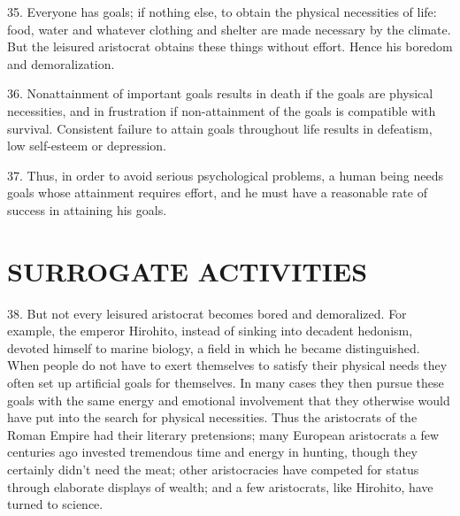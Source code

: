 \documentclass{article}
\begin{document}
35. Everyone has goals; if nothing else, to obtain the physical necessities of life: food, water and 
whatever clothing and shelter are made necessary by the climate. But the leisured aristocrat 
obtains these things without effort. Hence his boredom and demoralization. \vspace{\baselineskip} \newpage

36. Nonattainment of important goals results in death if the goals are physical necessities, and in 
frustration if non-attainment of the goals is compatible with survival. Consistent failure to attain 
goals throughout life results in defeatism, low self-esteem or depression. \vspace{\baselineskip}

37. Thus, in order to avoid serious psychological problems, a human being needs goals whose 
attainment requires effort, and he must have a reasonable rate of success in attaining his goals. 


\section{SURROGATE ACTIVITIES}

\hspace{0.5cm} 38. But not every leisured aristocrat becomes bored and demoralized. For example, the emperor 
Hirohito, instead of sinking into decadent hedonism, devoted himself to marine biology, a field in 
which he became distinguished. When people do not have to exert themselves to satisfy their 
physical needs they often set up artificial goals for themselves. In many cases they then pursue 
these goals with the same energy and emotional involvement that they otherwise would have put 
into the search for physical necessities. Thus the aristocrats of the Roman Empire had their literary 
pretensions; many European aristocrats a few centuries ago invested tremendous time and energy 
in hunting, though they certainly didn’t need the meat; other aristocracies have competed for status 
through elaborate displays of wealth; and a few aristocrats, like Hirohito, have turned to science. \vspace{\baselineskip}
\end{document}
